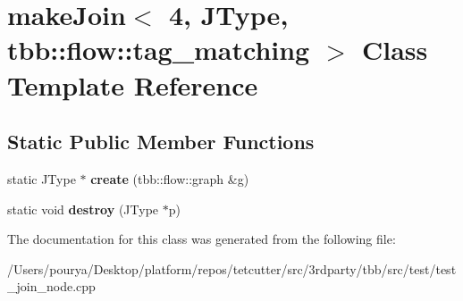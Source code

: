 \hypertarget{classmakeJoin_3_014_00_01JType_00_01tbb_1_1flow_1_1tag__matching_01_4}{}\section{make\+Join$<$ 4, J\+Type, tbb\+:\+:flow\+:\+:tag\+\_\+matching $>$ Class Template Reference}
\label{classmakeJoin_3_014_00_01JType_00_01tbb_1_1flow_1_1tag__matching_01_4}
\subsection*{Static Public Member Functions}
\begin{DoxyCompactItemize}
\item 
\hypertarget{classmakeJoin_3_014_00_01JType_00_01tbb_1_1flow_1_1tag__matching_01_4_ad5586e098d9c5295090acff5eda3ea6a}{}static J\+Type $\ast$ {\bfseries create} (tbb\+::flow\+::graph \&g)\label{classmakeJoin_3_014_00_01JType_00_01tbb_1_1flow_1_1tag__matching_01_4_ad5586e098d9c5295090acff5eda3ea6a}

\item 
\hypertarget{classmakeJoin_3_014_00_01JType_00_01tbb_1_1flow_1_1tag__matching_01_4_ae1a548111c21bcc1b991861bff4b54c5}{}static void {\bfseries destroy} (J\+Type $\ast$p)\label{classmakeJoin_3_014_00_01JType_00_01tbb_1_1flow_1_1tag__matching_01_4_ae1a548111c21bcc1b991861bff4b54c5}

\end{DoxyCompactItemize}


The documentation for this class was generated from the following file\+:\begin{DoxyCompactItemize}
\item 
/\+Users/pourya/\+Desktop/platform/repos/tetcutter/src/3rdparty/tbb/src/test/test\+\_\+join\+\_\+node.\+cpp\end{DoxyCompactItemize}
